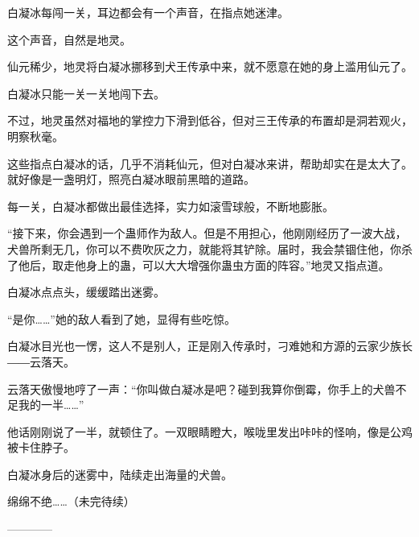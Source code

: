 \begin{this_body}
白凝冰每闯一关，耳边都会有一个声音，在指点她迷津。

这个声音，自然是地灵。

仙元稀少，地灵将白凝冰挪移到犬王传承中来，就不愿意在她的身上滥用仙元了。

白凝冰只能一关一关地闯下去。

不过，地灵虽然对福地的掌控力下滑到低谷，但对三王传承的布置却是洞若观火，明察秋毫。

这些指点白凝冰的话，几乎不消耗仙元，但对白凝冰来讲，帮助却实在是太大了。就好像是一盏明灯，照亮白凝冰眼前黑暗的道路。

每一关，白凝冰都做出最佳选择，实力如滚雪球般，不断地膨胀。

“接下来，你会遇到一个蛊师作为敌人。但是不用担心，他刚刚经历了一波大战，犬兽所剩无几，你可以不费吹灰之力，就能将其铲除。届时，我会禁锢住他，你杀了他后，取走他身上的蛊，可以大大增强你蛊虫方面的阵容。”地灵又指点道。

白凝冰点点头，缓缓踏出迷雾。

“是你……”她的敌人看到了她，显得有些吃惊。

白凝冰目光也一愣，这人不是别人，正是刚入传承时，刁难她和方源的云家少族长――云落天。

云落天傲慢地哼了一声：“你叫做白凝冰是吧？碰到我算你倒霉，你手上的犬兽不足我的一半……”

他话刚刚说了一半，就顿住了。一双眼睛瞪大，喉咙里发出咔咔的怪响，像是公鸡被卡住脖子。

白凝冰身后的迷雾中，陆续走出海量的犬兽。

绵绵不绝……（未完待续）

------------

\end{this_body}

